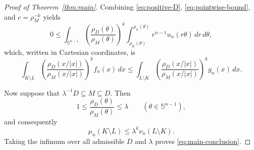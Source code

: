\documentclass[10pt,a4paper]{amsart}
\newcommand{\Sph}{\mathbb{S}}
\newcommand{\dd}{\,d}
\begin{document}
\begin{proof}[Proof of Theorem~\ref{thm:main}]
Combining \eqref{eq:positive-D}, \eqref{eq:pointwise-bound}, and
$c=\rho_M^{-k}$ yields
\[
 0
 \leq
 \int_{\Sph^{n-1}}
 \left(\frac{\rho_D(\theta)}{\rho_M(\theta)}\right)^k
 \int_{\rho_K(\theta)}^{\rho_L(\theta)}
 r^{n-1}u_n(r\theta)\dd r\dd\theta,
\]
which, written in Cartesian coordinates, is
\begin{equation}\label{eq:before-BM}
 \int_{K\setminus L}
 \left(\frac{\rho_D(x/|x|)}{\rho_M(x/|x|)}\right)^k
 f_n(x)\dd x
 \leq
 \int_{L\setminus K}
 \left(\frac{\rho_D(x/|x|)}{\rho_M(x/|x|)}\right)^k
 g_n(x)\dd x.
\end{equation}

Now suppose that $\lambda^{-1}D\subseteq M\subseteq D$. Then
\[
 1\leq\frac{\rho_D(\theta)}{\rho_M(\theta)}\leq\lambda
 \qquad(\theta\in\Sph^{n-1}),
\]
and consequently
\[
 \mu_n(K\setminus L)
 \leq\lambda^k\nu_n(L\setminus K).
\]
Taking the infimum over all admissible $D$ and $\lambda$ proves
\eqref{eq:main-conclusion}.
\end{proof}
\end{document}
